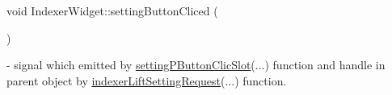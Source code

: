 \mbox{\label{classIndexerWidget_a5b786596789da83ff37ad1c8df223d0f}} 
{\footnotesize\ttfamily void Indexer\+Widget\+::\texorpdfstring{setting\+Button\+Cliced}{settingButtonCliced} (\begin{DoxyParamCaption}{ }\end{DoxyParamCaption}){\ttfamily [signal]}} - signal which emitted by \hyperlink{classIndexerWidget_a4621d1eb9163b44c7d5343551e8bb225}{setting\+P\+Button\+Clic\+Slot}(...) function and handle in parent object by \hyperlink{classMainWindow_a867f15b0c134336e5477e80673f1903d}{indexer\+Lift\+Setting\+Request}(...) function.

